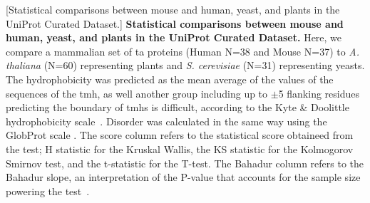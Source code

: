 \begin{table}[htbp]

\centering

[Statistical comparisons between mouse and human, yeast, and plants in the UniProt Curated Dataset.]
{\textbf{Statistical comparisons between mouse and human, yeast, and plants in the UniProt Curated Dataset.}
Here, we compare a mammalian set of \gls{ta} proteins (Human N=38 and Mouse N=37) to \textit{A. thaliana} (N=60) representing plants  and  \textit{S. cerevisiae} (N=31) representing yeasts.
The hydrophobicity was predicted as the mean average of the values of the sequences of the \gls{tmh}, as well another group including up to $\pm$5 flanking residues predicting the boundary of \gls{tmh}s is difficult, according to the Kyte \& Doolittle hydrophobicity scale~\cite{Kyte1982}.
Disorder was calculated in the same way using the GlobProt scale \cite{Linding2003}.
The score column refers to the statistical score obtaineed from the test; H statistic for the Kruskal Wallis, the KS statistic for the Kolmogorov Smirnov test, and the t-statistic for the T-test.
The Bahadur column refers to the Bahadur slope, an interpretation of the P-value that accounts for the sample size powering the test~\cite{Bahadur1967, Bahadur1971}.}

\end{table}
